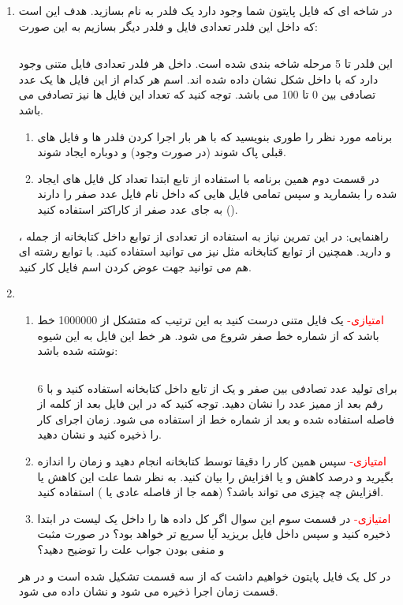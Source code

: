 \documentclass[oneside]{article}
\newcommand{\inputcode}[2]{\inputminted[mathescape,%
                                                 linenos=true,%
                                                 formatcom=\small\setstretch{1}]{#1}{#2}}%
\begin{document}
\begin{enumerate}
\item
در شاخه ای که فایل پایتون شما وجود دارد یک فلدر به نام
بسازید. هدف این است که داخل این فلدر تعدادی فایل و فلدر دیگر بسازیم به این صورت:
\begin{latin}\inputcode{Text}{random_folder_structure.txt}\end{latin}
این فلدر تا 5 مرحله شاخه بندی شده است. داخل هر فلدر تعدادی فایل متنی وجود دارد که با 
داخل شکل نشان داده شده اند. اسم هر کدام از این فایل ها یک عدد تصادفی بین 0 تا 100 می باشد. توجه کنید که تعداد این فایل ها نیز تصادفی می باشد. 
\begin{enumerate}
\item
برنامه مورد نظر را طوری بنویسید که با هر بار اجرا کردن فلدر ها و فایل های قبلی پاک شوند (در صورت وجود) و دوباره ایجاد شوند.
\item
در قسمت دوم همین برنامه با استفاده از تابع
ابتدا تعداد کل فایل های ایجاد شده را بشمارید و سپس  تمامی  فایل هایی که داخل  نام  فایل عدد صفر را دارند به جای عدد صفر از کاراکتر
استفاده کنید 
().
\end{enumerate}
راهنمایی: در این تمرین نیاز به استفاده از تعدادی از توابع داخل کتابخانه 
از جمله
،
و 
دارید. همچنین از توابع کتابخانه
مثل
نیز می توانید استفاده کنید. با توابع رشته ای هم می توانید جهت عوض کردن اسم فایل کار کنید.
\item
\begin{enumerate}
\item
 \textcolor{red}{امتیازی-}
یک فایل متنی درست کنید به این ترتیب که متشکل از 
\num{1000000}
 خط باشد که از شماره خط صفر شروع می شود. هر خط این فایل به این شیوه نوشته شده باشد:
\begin{latin}\inputcode{Text}{random.txt}\end{latin}
برای تولید عدد تصادفی بین صفر و یک از تابع 
داخل کتابخانه
استفاده کنید و با 6 رقم بعد از ممیز عدد را نشان دهید. توجه کنید که در این فایل بعد از کلمه
از فاصله استفاده شده و بعد از شماره خط از 
استفاده می شود. زمان اجرای کار را ذخیره کنید و نشان دهید. 
\item
\textcolor{red}{امتیازی-}
سپس همین کار را دقیقا توسط کتابخانه 
انجام دهید و زمان را اندازه بگیرید و درصد کاهش و یا افزایش را بیان کنید. به نظر شما علت این کاهش یا افزایش چه چیزی می تواند باشد؟ (همه جا از فاصله عادی یا
)
استفاده کنید.
\item
\textcolor{red}{امتیازی-}
در قسمت سوم این سوال اگر کل داده ها را داخل یک لیست در ابتدا ذخیره کنید و سپس داخل فایل بریزید آیا سریع تر خواهد بود؟ در صورت مثبت و منفی بودن جواب علت را توضیح دهید؟
\end{enumerate}
در کل یک فایل پایتون خواهیم داشت که از سه قسمت تشکیل شده است و در هر قسمت زمان اجرا ذخیره می شود و نشان داده می شود.


\end{enumerate}
\end{document}
